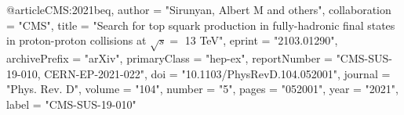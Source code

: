 @article{CMS:2021beq,
    author = "Sirunyan, Albert M and others",
    collaboration = "CMS",
    title = "{Search for top squark production in fully-hadronic final states in proton-proton collisions at $\sqrt{s} =$ 13 TeV}",
    eprint = "2103.01290",
    archivePrefix = "arXiv",
    primaryClass = "hep-ex",
    reportNumber = "CMS-SUS-19-010, CERN-EP-2021-022",
    doi = "10.1103/PhysRevD.104.052001",
    journal = "Phys. Rev. D",
    volume = "104",
    number = "5",
    pages = "052001",
    year = "2021",
    label = "CMS-SUS-19-010"
}

